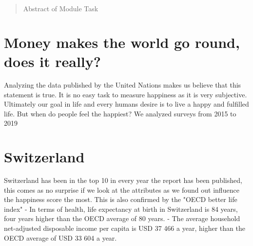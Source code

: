 \documentclass[a0,portrait]{a0poster}
\begin{document}
\begin{multicols}{2} %


\color{Navy} %

\begin{abstract}

Abstract of Module Task


\end{abstract}

\color{DarkSlateGray} %

\section*{Money makes the world go round, does it really?}

Analyzing the data published by the United Nations makes us believe that this statement is true. It is no easy task to measure happiness as it is very subjective. Ultimately our goal in life and every humans desire is to live a happy and fulfilled life. But when do people feel the happiest?
We analyzed surveys from 2015 to 2019 



\section*{Switzerland}

Switzerland has been in the top 10 in every year the report has been published, this comes as no surprise if we look at the attributes as we found out influence the happiness score the most. 
This is also confirmed by the "OECD better life index"
- In terms of health, life expectancy at birth in Switzerland is 84 years, four years higher than the OECD average of 80 years.
- The average household net-adjusted disposable income per capita is USD 37 466 a year, higher than the OECD average of USD 33 604 a year.


\end{multicols}
\end{document}
